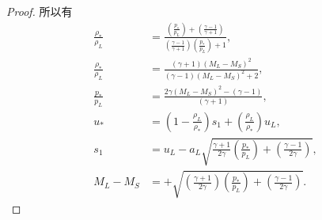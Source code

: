 \documentclass[12pt]{article}
\begin{document}
\begin{proof}
	所以有
	\begin{align}
		\frac{\rho_{*}}{\rho_{L}}         & =\frac{\left(\frac{p_{*}}{p_{L}}\right)+\left(\frac{\gamma-1}{\gamma+1}\right)}{\left(\frac{\gamma-1}{\gamma+1}\right)\left(\frac{p_{*}}{p_{L}}\right)+1}, \\
		\frac{\rho_{*}}{\rho_{L}}         & =\frac{(\gamma+1)\left(M_{L}-M_{S}\right)^{2}}{(\gamma-1)\left(M_{L}-M_{S}\right)^{2}+2},                                                                  \\
		\frac{p_{*}}{p_{L}}               & =\frac{2 \gamma\left(M_{L}-M_{S}\right)^{2}-(\gamma-1)}{(\gamma+1)},                                                                                       \\
		u_{*}                             & =\left(1-\frac{\rho_{L}}{\rho_{*}}\right) s_{1}+\left(\frac{\rho_{L}}{\rho_{*}}\right) u_{L},                                                              \\
		s_{1}                             & =u_{L}-a_{L} \sqrt{\frac{\gamma+1}{2 \gamma}\left(\frac{p_{*}}{p_{L}}\right)+\left(\frac{\gamma-1}{2 \gamma}\right)},                                      \\
		M_{L}                      -M_{S} & =+\sqrt{\left(\frac{\gamma+1}{2 \gamma}\right)\left(\frac{p_{*}}{p_{L}}\right)+\left(\frac{\gamma-1}{2 \gamma}\right)}.
	\end{align}


\end{proof}



% 
\end{document}
